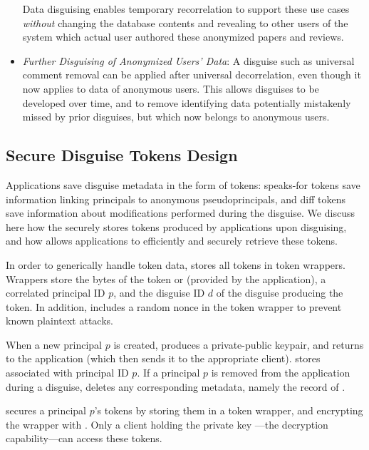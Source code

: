 \begin{itemize}
Data disguising enables temporary recorrelation to support these use cases \emph{without} changing
        the database contents and revealing to other users of the system
which actual user authored these anonymized papers and reviews.

\item \emph{Further Disguising of Anonymized Users' Data}: A disguise such as universal comment
        removal can be applied after universal decorrelation, even though it now applies to data of anonymous users.
This allows disguises to be developed over time, and to remove identifying data potentially mistakenly missed by prior
disguises, but which now belongs to anonymous users.
\end{itemize}


\subsection{Secure Disguise Tokens Design}
Applications save disguise metadata in the form of tokens: speaks-for tokens  save information linking
principals to anonymous pseudoprincipals, and diff tokens  save information about modifications
performed during the disguise.
We discuss here how the \sys securely stores tokens produced by applications upon disguising, and
how \sys allows applications to efficiently and securely retrieve these tokens.

In order to generically handle token data, \sys stores all tokens in token wrappers.
Wrappers store the bytes of the token  or  (provided
by the application), a correlated principal ID $p$, and the disguise ID $d$ of the disguise producing the
token. In addition, \sys includes a random nonce in the token wrapper to prevent known plaintext
attacks.

When a new principal $p$ is created, \sys produces a private-public keypair, and returns  to
the application (which then sends it to the appropriate client). \sys stores  associated
with principal ID $p$.
If a principal $p$ is removed from the application during a disguise, \sys deletes any corresponding metadata, namely
the record of .

\sys secures a principal $p$'s tokens by storing them in a token wrapper, and encrypting the wrapper
with . Only a client holding the private key ---the decryption
capability---can access these tokens.

